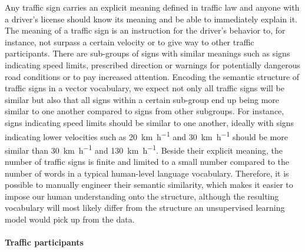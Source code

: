 Any traffic sign carries an explicit meaning defined in traffic law and anyone with a driver's license should know its meaning and be able to immediately explain it.
The meaning of a traffic sign is an instruction for the driver's behavior to, for instance, not surpass a certain velocity or to give way to other traffic participants. 
There are sub-groups of signs with similar meanings such as signs indicating speed limits, prescribed direction or warnings for potentially dangerous road conditions or to pay increased attention.
Encoding the semantic structure of traffic signs in a vector vocabulary, we expect not only all traffic signs will be similar but also that all signs within a certain sub-group end up being more similar to one another compared to signs from other subgroups. 
For instance, signs indicating speed limits should be similar to one another, ideally with signs indicating lower velocities such as \SI[per-mode=symbol]{20}{\kilo\meter\per\hour} and \SI[per-mode=symbol]{30}{\kilo\meter\per\hour} should be more similar than \SI[per-mode=symbol]{30}{\kilo\meter\per\hour} and \SI[per-mode=symbol]{130}{\kilo\meter\per\hour}. 
Beside their explicit meaning, the number of traffic signs is finite and limited to a small number compared to the number of words in a typical human-level language vocabulary.
Therefore, it is possible to manually engineer their semantic similarity, which makes it easier to impose our human understanding onto the structure, although the resulting vocabulary will most likely differ from the structure an unsupervised learning model would pick up from the data. 

\paragraph{Traffic participants}%
\label{par:traffic_participants}

